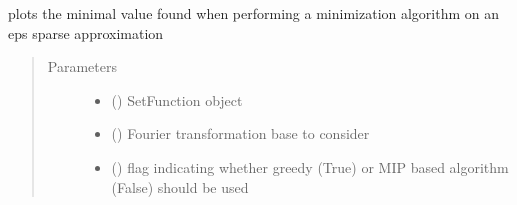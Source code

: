 \documentclass[letterpaper,10pt,english]{sphinxmanual}
\begin{document}
\begin{fulllineitems}
\label{\detokenize{setFTs:setFTs.plotting.plot_minimization_found}}
\sphinxAtStartPar
plots the minimal value found when performing a minimization algorithm on an eps sparse approximation
\begin{quote}\begin{description}
\item[{Parameters}] \leavevmode\begin{itemize}
\item {} 
\sphinxAtStartPar
{} ({\hyperref[\detokenize{setFTs:setFTs.setfunctions.SetFunction}]{}}) \textendash{} SetFunction object

\item {} 
\sphinxAtStartPar
{} () \textendash{} Fourier transformation base to consider

\item {} 
\sphinxAtStartPar
{} () \textendash{} flag indicating whether greedy (True) or MIP based algorithm (False) should be used

\end{itemize}

\end{description}\end{quote}

\end{fulllineitems}

\end{document}
